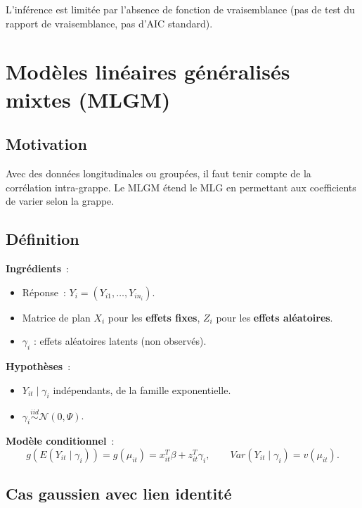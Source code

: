 \documentclass[11pt,letterpaper]{article}
\begin{document}
L'inférence est limitée par l'absence de fonction de vraisemblance (pas de test du rapport de vraisemblance, pas d'AIC standard).

\newpage
\section{Modèles linéaires généralisés mixtes (MLGM)}

\subsection{Motivation}

Avec des données longitudinales ou groupées, il faut tenir compte de la corrélation intra-grappe. Le MLGM étend le MLG en permettant aux coefficients de varier selon la grappe.

\subsection{Définition}

\textbf{Ingrédients}~:
\begin{itemize}
\item Réponse~: $Y_i = (Y_{i1},\ldots,Y_{in_i})$.
\item Matrice de plan $X_i$ pour les \textbf{effets fixes}, $Z_i$ pour les \textbf{effets aléatoires}.
\item $\gamma_i$ : effets aléatoires latents (non observés).
\end{itemize}

\textbf{Hypothèses}~:
\begin{itemize}
\item $Y_{it} \mid \gamma_i$ indépendants, de la famille exponentielle.
\item $\gamma_i \stackrel{iid}{\sim} \mathcal{N}(0, \Psi)$.
\end{itemize}

\textbf{Modèle conditionnel}~:
$$g(E(Y_{it} \mid \gamma_i)) = g(\mu_{it}) = x_{it}^T \beta + z_{it}^T \gamma_i, \qquad Var(Y_{it} \mid \gamma_i) = v(\mu_{it}).$$

\subsection{Cas gaussien avec lien identité}
\end{document}
